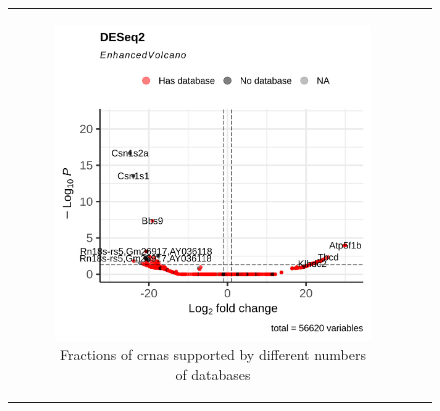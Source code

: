 \begin{figure}[H] \begin{tabular}{cc}
        \begin{subfigure}{0.5\textwidth} \centering

            \includegraphics[width=\linewidth]{chapters/4_results_and_discussion/figures/dea/deseq2/letrozole/volcano.png}
            \caption{Fractions of \glspl{crna} supported by
                different numbers of databases}
            \label{fig:letrozole_volcano_deseq2}
        \end{subfigure}
        \begin{subfigure}{0.5\textwidth}
            \centering


\end{subfigure}
\end{tabular}
\end{figure}
